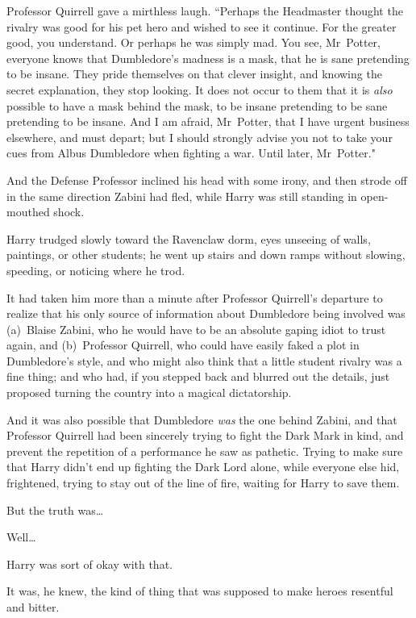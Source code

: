 Professor Quirrell gave a mirthless laugh. ``Perhaps the Headmaster thought the rivalry was good for his pet hero and wished to see it continue. For the greater good, you understand. Or perhaps he was simply mad. You see, Mr~Potter, everyone knows that Dumbledore's madness is a mask, that he is sane pretending to be insane. They pride themselves on that clever insight, and knowing the secret explanation, they stop looking. It does not occur to them that it is \emph{also} possible to have a mask behind the mask, to be insane pretending to be sane pretending to be insane. And I am afraid, Mr~Potter, that I have urgent business elsewhere, and must depart; but I should strongly advise you not to take your cues from Albus Dumbledore when fighting a war. Until later, Mr~Potter."

And the Defense Professor inclined his head with some irony, and then strode off in the same direction Zabini had fled, while Harry was still standing in open-mouthed shock.


Harry trudged slowly toward the Ravenclaw dorm, eyes unseeing of walls, paintings, or other students; he went up stairs and down ramps without slowing, speeding, or noticing where he trod.

It had taken him more than a minute after Professor Quirrell's departure to realize that his only source of information about Dumbledore being involved was (a)~Blaise Zabini, who he would have to be an absolute gaping idiot to trust again, and (b)~Professor Quirrell, who could have easily faked a plot in Dumbledore's style, and who might also think that a little student rivalry was a fine thing; and who had, if you stepped back and blurred out the details, just proposed turning the country into a magical dictatorship.

And it was also possible that Dumbledore \emph{was} the one behind Zabini, and that Professor Quirrell had been sincerely trying to fight the Dark Mark in kind, and prevent the repetition of a performance he saw as pathetic. Trying to make sure that Harry didn't end up fighting the Dark Lord alone, while everyone else hid, frightened, trying to stay out of the line of fire, waiting for Harry to save them.

But the truth was{\ldots}

Well{\ldots}

Harry was sort of okay with that.

It was, he knew, the kind of thing that was supposed to make heroes resentful and bitter.

